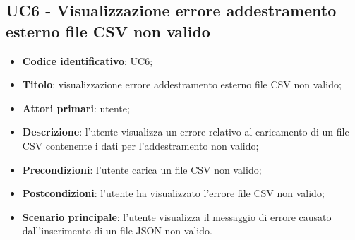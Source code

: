 \subsection{UC6 - Visualizzazione errore addestramento esterno file CSV non valido}
\begin{itemize}
	\item \textbf{Codice identificativo}: UC6;
	\item \textbf{Titolo}: visualizzazione errore addestramento esterno file CSV non valido;
	\item \textbf{Attori primari}: utente;
	\item \textbf{Descrizione}:  l'utente visualizza un errore relativo al caricamento di un file CSV contenente i dati per l'addestramento non valido;
	\item \textbf{Precondizioni}: l'utente carica un file CSV non valido;
	\item \textbf{Postcondizioni}: l'utente ha visualizzato l'errore file CSV non valido;	
	\item \textbf{Scenario principale}: l'utente visualizza il messaggio di errore causato dall'inserimento di un file JSON non valido.	
\end{itemize}
